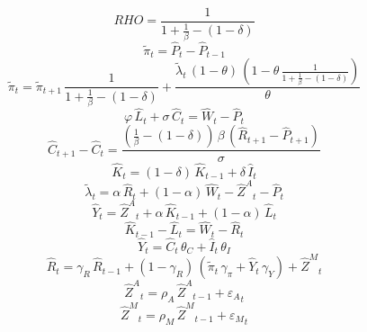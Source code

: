 \begin{dmath*}
RHO = \frac{1}{1+\frac{1}{{{\beta}}}-\left(1-{{\delta}}\right)}
\end{dmath*}
\begin{dmath}
{{\tilde{\pi}}}_{t}={{\hat{P}}}_{t}-{{\hat{P}}}_{t-1}
\end{dmath}
\begin{dmath}
{{\tilde{\pi}}}_{t}={{\tilde{\pi}}}_{t+1}\, \frac{1}{1+\frac{1}{{{\beta}}}-\left(1-{{\delta}}\right)}+\frac{{{\tilde{\lambda}}}_{t}\, \left(1-{{\theta}}\right)\, \left(1-{{\theta}}\, \frac{1}{1+\frac{1}{{{\beta}}}-\left(1-{{\delta}}\right)}\right)}{{{\theta}}}
\end{dmath}
\begin{dmath}
{{\varphi}}\, {{\hat{L}}}_{t}+{{\sigma}}\, {{\hat{C}}}_{t}={{\hat{W}}}_{t}-{{\hat{P}}}_{t}
\end{dmath}
\begin{dmath}
{{\hat{C}}}_{t+1}-{{\hat{C}}}_{t}=\frac{\left(\frac{1}{{{\beta}}}-\left(1-{{\delta}}\right)\right)\, {{\beta}}\, \left({{\hat{R}}}_{t+1}-{{\hat{P}}}_{t+1}\right)}{{{\sigma}}}
\end{dmath}
\begin{dmath}
{{\hat{K}}}_{t}=\left(1-{{\delta}}\right)\, {{\hat{K}}}_{t-1}+{{\delta}}\, {{\hat{I}}}_{t}
\end{dmath}
\begin{dmath}
{{\tilde{\lambda}}}_{t}={{\alpha}}\, {{\hat{R}}}_{t}+\left(1-{{\alpha}}\right)\, {{\hat{W}}}_{t}-{{\hat{Z}^A}}_{t}-{{\hat{P}}}_{t}
\end{dmath}
\begin{dmath}
{{\hat{Y}}}_{t}={{\hat{Z}^A}}_{t}+{{\alpha}}\, {{\hat{K}}}_{t-1}+\left(1-{{\alpha}}\right)\, {{\hat{L}}}_{t}
\end{dmath}
\begin{dmath}
{{\hat{K}}}_{t-1}-{{\hat{L}}}_{t}={{\hat{W}}}_{t}-{{\hat{R}}}_{t}
\end{dmath}
\begin{dmath}
{{\hat{Y}}}_{t}={{\hat{C}}}_{t}\, {{\theta_C}}+{{\hat{I}}}_{t}\, {{\theta_I}}
\end{dmath}
\begin{dmath}
{{\hat{R}}}_{t}={{\gamma_R}}\, {{\hat{R}}}_{t-1}+\left(1-{{\gamma_R}}\right)\, \left({{\tilde{\pi}}}_{t}\, {{\gamma_\pi}}+{{\hat{Y}}}_{t}\, {{\gamma_Y}}\right)+{{\hat{Z}^M}}_{t}
\end{dmath}
\begin{dmath}
{{\hat{Z}^A}}_{t}={{\rho_A}}\, {{\hat{Z}^A}}_{t-1}+{{\varepsilon_A}}_{t}
\end{dmath}
\begin{dmath}
{{\hat{Z}^M}}_{t}={{\rho_M}}\, {{\hat{Z}^M}}_{t-1}+{{\varepsilon_M}}_{t}
\end{dmath}
